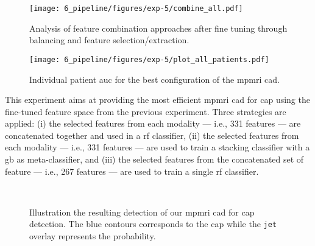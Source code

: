 \begin{figure}
  \centering
  \texttt{[image: 6\_pipeline/figures/exp-5/combine\_all.pdf]}
  \caption[Analysis of feature combination approaches after fine tuning.]{Analysis of feature combination approaches after fine tuning through balancing and feature selection/extraction.}
  \label{fig:res-Ex4}
\end{figure}

\begin{figure}
  \centering
  \texttt{[image: 6\_pipeline/figures/exp-5/plot\_all\_patients.pdf]}
  \caption{Individual patient \acs*{auc} for the best configuration of the \acs*{mpmri} \acs*{cad}.}
  \label{fig:indauc}
\end{figure}

This experiment aims at providing the most efficient \ac{mpmri} \ac{cad} for \ac{cap} using the fine-tuned feature space from the previous experiment.
Three strategies are applied:
(i) the selected features from each modality --- i.e., 331 features --- are concatenated together and used in a \ac{rf} classifier,
(ii) the selected features from each modality --- i.e., 331 features --- are used to train a stacking classifier with a \ac{gb} as meta-classifier, and
(iii) the selected features from the concatenated set of feature --- i.e., 267 features --- are used to train a single \ac{rf} classifier.

\begin{landscape}
\begin{figure}
  \hspace*{\fill}
  \hfill
  \hfill
  \hspace*{\fill}\\
  \hspace*{\fill}
  \hfill
  \hfill
  \hspace*{\fill}
  \caption[Illustration the resulting detection of our \acs*{mpmri} \acs*{cad} for \acs*{cap} detection.]{Illustration the resulting detection of our \acs*{mpmri} \acs*{cad} for \acs*{cap} detection. The blue contours corresponds to the \ac{cap} while the \texttt{jet} overlay represents the probability.}
  \label{fig:resultcad}
\end{figure}
\end{landscape}

